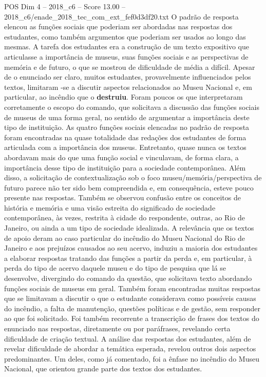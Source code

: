 \begin{textsample}{POS Dim 4 – 2018\_c6 – Score 13.00 – 2018\_c6/enade\_2018\_tec\_com\_ext\_fef0d3df20.txt}
O padrão de resposta elencou as funções sociais que poderiam ser abordadas nas respostas dos estudantes, como também argumentos que poderiam ser usados ao longo das mesmas.
A tarefa dos estudantes era a construção de um texto expositivo que articulasse a importância de museus, suas funções sociais e as perspectivas de memória e de futuro, o que se mostrou de dificuldade de média a difícil.
Apesar de o enunciado ser claro, muitos estudantes, provavelmente influenciados pelos textos, limitaram -se a discutir aspectos relacionados ao Museu Nacional e, em particular, ao incêndio que o \textbf{destruiu}.
Foram poucos os que interpretaram corretamente o escopo do comando, que solicitava a discussão das funções sociais de museus de uma forma geral, no sentido de argumentar a importância deste tipo de instituição.
As quatro funções sociais elencadas no padrão de resposta foram encontradas na quase totalidade das redações dos estudantes de forma articulada com a importância dos museus.
Entretanto, quase nunca os textos abordavam mais do que uma função social e vinculavam, de forma clara, a importância desse tipo de instituição para a sociedade contemporânea.
Além disso, a solicitação de contextualização sob o foco museu/memória/perspectiva de futuro parece não ter sido bem compreendida e, em consequência, esteve pouco presente nas respostas.
Também se observou confusão entre os conceitos de história e memória e uma visão estreita do significado de sociedade contemporânea, às vezes, restrita à cidade do respondente, outras, ao Rio de Janeiro, ou ainda a um tipo de sociedade idealizada.
A relevância que os textos de apoio deram ao caso particular do incêndio do Museu Nacional do Rio de Janeiro e aos prejuízos causados ao seu acervo, induziu a maioria dos estudantes a elaborar respostas tratando das funções a partir da perda e, em particular, à perda do tipo de acervo daquele museu e do tipo de pesquisa que lá se desenvolve, divergindo do comando da questão, que solicitava texto abordando funções sociais de museus em geral.
Também foram encontradas muitas respostas que se limitavam a discutir o que o estudante considerava como possíveis causas do incêndio, a falta de manutenção, questões políticas e de gestão, sem responder ao que foi solicitado.
Foi também recorrente a transcrição de frases dos textos do enunciado nas respostas, diretamente ou por paráfrases, revelando certa dificuldade de criação textual.
A análise das respostas dos estudantes, além de revelar dificuldade de abordar a temática esperada, revelou outros dois aspectos predominantes.
Um deles, como já comentado, foi a ênfase no incêndio do Museu Nacional, que orientou grande parte dos textos dos estudantes.

\end{textsample}

